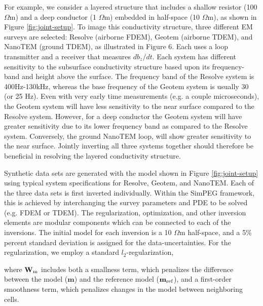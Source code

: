 \documentclass[paper]{geophysics}
\begin{document}
For example, we consider a layered structure that includes a shallow resistor (100 $\Omega$m) and a deep conductor (1 $\Omega$m) embedded in half-space (10 $\Omega$m), as shown in Figure \ref{fig:joint-setup}. To image this conductivity structure, three different EM surveys are selected: Resolve (airborne FDEM), Geotem (airborne TDEM), and NanoTEM (ground TDEM), as illustrated in Figure 6. Each uses a loop transmitter and a receiver that measures $db_z/dt$. Each system has different sensitivity to the subsurface conductivity structure based upon its frequency-band and height above the surface. The frequency band of the Resolve system is 400Hz-130kHz, whereas the base frequency of the Geotem system is usually 30 (or 25 Hz). Even with very early time measurements (e.g. a couple microseconds), the Geotem system will have less sensitivity to the near surface compared to the Resolve system. However, for a deep conductor the Geotem system will have greater sensitivity due to its lower frequency band as compared to the Resolve system. Conversely, the ground NanoTEM loop, will show greater sensitivity to the near surface. Jointly inverting all three systems together should therefore be beneficial in resolving the layered conductivity structure.





Synthetic data sets are generated with the model shown in Figure \ref{fig:joint-setup} using  typical system specifications for Resolve, Geotem, and NanoTEM. Each of the three data sets is first inverted individually. Within the SimPEG framework, this is achieved by interchanging the survey parameters and PDE to be solved (e.g. FDEM or TDEM). The regularization, optimization, and other inversion elements are modular components which can be connected to each of the inversions. The initial model for each inversion is a 10 $\Omega$m half-space, and a 5\% percent standard deviation is assigned for the data-uncertainties. For the regularization, we employ a standard $l_2$-regularization,


where $\mathbf{W}_{\rm m}$ includes both a smallness term, which penalizes the difference between the model ($\mathbf{m}$) and the reference model ($\mathbf{m}_{\rm ref}$), and a first-order smoothness term, which penalizes changes in the model between neighboring cells.
\end{document}
